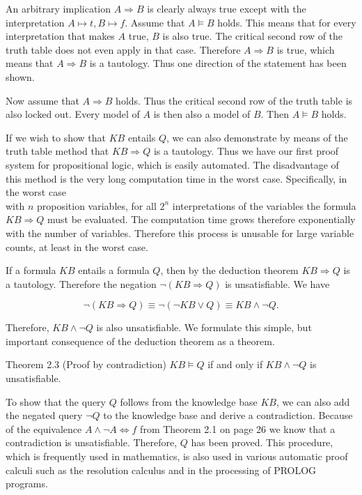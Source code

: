 \documentclass[10pt]{book}
\begin{document}
An arbitrary implication $A \Rightarrow B$ is clearly always true except with the interpretation $A \longmapsto t, B \longmapsto f$. Assume that $A \models B$ holds. This means that for every interpretation that makes $A$ true, $B$ is also true. The critical second row of the truth table does not even apply in that case. Therefore $A \Rightarrow B$ is true, which means that $A \Rightarrow B$ is a tautology. Thus one direction of the statement has been shown.

Now assume that $A \Rightarrow B$ holds. Thus the critical second row of the truth table is also locked out. Every model of $A$ is then also a model of $B$. Then $A \models B$ holds.

If we wish to show that $K B$ entails $Q$, we can also demonstrate by means of the truth table method that $K B \Rightarrow Q$ is a tautology. Thus we have our first proof system for propositional logic, which is easily automated. The disadvantage of this method is the very long computation time in the worst case. Specifically, in the worst case\\
with $n$ proposition variables, for all $2^{n}$ interpretations of the variables the formula $K B \Rightarrow Q$ must be evaluated. The computation time grows therefore exponentially with the number of variables. Therefore this process is unusable for large variable counts, at least in the worst case.


If a formula $K B$ entails a formula $Q$, then by the deduction theorem $K B \Rightarrow Q$ is a tautology. Therefore the negation $\neg(K B \Rightarrow Q)$ is unsatisfiable. We have

$$
\neg(K B \Rightarrow Q) \equiv \neg(\neg K B \vee Q) \equiv K B \wedge \neg Q .
$$

Therefore, $K B \wedge \neg Q$ is also unsatisfiable. We formulate this simple, but important consequence of the deduction theorem as a theorem.

Theorem 2.3 (Proof by contradiction) $K B \models Q$ if and only if $K B \wedge \neg Q$ is unsatisfiable.

To show that the query $Q$ follows from the knowledge base $K B$, we can also add the negated query $\neg Q$ to the knowledge base and derive a contradiction. Because of the equivalence $A \wedge \neg A \Leftrightarrow f$ from Theorem 2.1 on page 26 we know that a contradiction is unsatisfiable. Therefore, $Q$ has been proved. This procedure, which is frequently used in mathematics, is also used in various automatic proof calculi such as the resolution calculus and in the processing of PROLOG programs.
\end{document}

